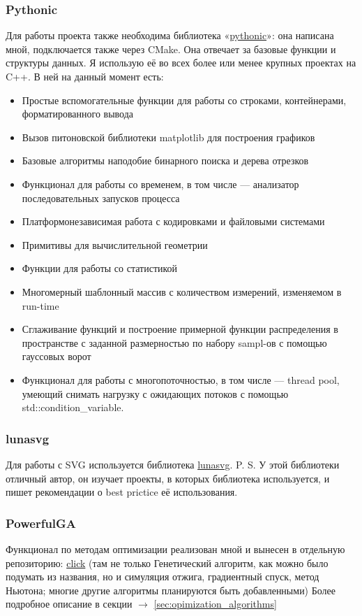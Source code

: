 \documentclass[11pt]{article}
\begin{document}
    \subsubsection{Pythonic}
    Для работы проекта также необходима библиотека «\href{https://github.com/donRumata03/pythonic}{pythonic}»: она написана мной, подключается также через CMake.
    Она отвечает за базовые функции и структуры данных.
    Я использую её во всех более или менее крупных проектах на C++.
    В ней на данный момент есть:
    \begin{itemize}
        \item Простые вспомогательные функции для работы со строками, контейнерами, форматированного вывода
        \item Вызов питоновской библиотеки matplotlib для построения графиков
        \item Базовые алгоритмы наподобие бинарного поиска и дерева отрезков
        \item Функционал для работы со временем, в том числе — анализатор последовательных запусков процесса
        \item Платформонезависимая работа с кодировками и файловыми системами
        \item Примитивы для вычислительной геометрии
        \item Функции для работы со статистикой
        \item Многомерный шаблонный массив с количеством измерений, изменяемом в run-time
        \item Сглаживание функций и построение примерной функции распределения в пространстве с заданной размерностью по набору sampl-ов с помощью гауссовых ворот
        \item Функционал для работы с многопоточностью, в том числе — thread pool, умеющий снимать нагрузку с ожидающих потоков с помощью std::condition\_variable.
    \end{itemize}

    \subsubsection{lunasvg}
    Для работы с SVG используется библиотека \href{https://github.com/sammycage/lunasvg}{lunasvg}.
    P. S. У этой библиотеки отличный автор, он изучает проекты, в которых библиотека используется, и пишет рекомендации о best prictice её использования.

    \subsubsection{PowerfulGA}
    Функционал по методам оптимизации реализован мной и вынесен в отдельную репозиторию: \href{https://github.com/donRumata03/PowerfulGA}{click}
    (там не только Генетический алгоритм, как можно было подумать из названия, но и симуляция отжига, градиентный спуск, метод Ньютона;
    многие другие алгоритмы планируются быть добавленными)
    Более подробное описание в секции $\longrightarrow$ \ref{sec:opimization_algorithms}
\end{document}
